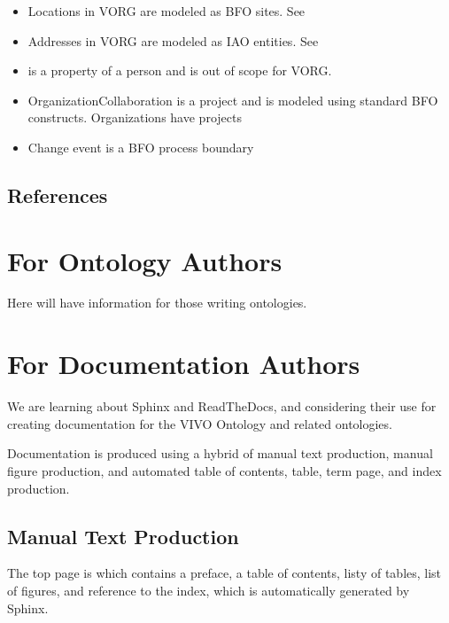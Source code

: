\documentclass[letterpaper,10pt,english]{sphinxmanual}
\begin{document}
\begin{itemize}
\item {} 
\sphinxAtStartPar
Locations in VORG are modeled as BFO sites.  See 

\item {} 
\sphinxAtStartPar
Addresses in VORG are modeled as IAO entities.  See 

\item {} 
\sphinxAtStartPar
{} is a property of a person and is out of scope for VORG.

\item {} 
\sphinxAtStartPar
OrganizationCollaboration is a project and is modeled using standard BFO constructs.
Organizations have  projects

\item {} 
\sphinxAtStartPar
Change event is a BFO process boundary

\end{itemize}


\section{References}
\label{\detokenize{notes-and-sources:references}}

\chapter{For Ontology Authors}
\label{\detokenize{ontology-authors:for-ontology-authors}}\label{\detokenize{ontology-authors::doc}}
\sphinxAtStartPar
Here will have information for those writing ontologies.


\chapter{For Documentation Authors}
\label{\detokenize{documentation-authors:for-documentation-authors}}\label{\detokenize{documentation-authors::doc}}
\sphinxAtStartPar
We are learning about Sphinx and ReadTheDocs, and considering their use
for creating documentation for the VIVO Ontology and related ontologies.

\sphinxAtStartPar
Documentation is produced using a hybrid of manual text production, manual
figure production, and automated table of contents, table, term page, and index
production.


\section{Manual Text Production}
\label{\detokenize{documentation-authors:manual-text-production}}
\sphinxAtStartPar
The top page is  which contains a preface, a table of contents, listy
of tables, list of figures, and reference to the index, which is automatically
generated by Sphinx.
\end{document}
